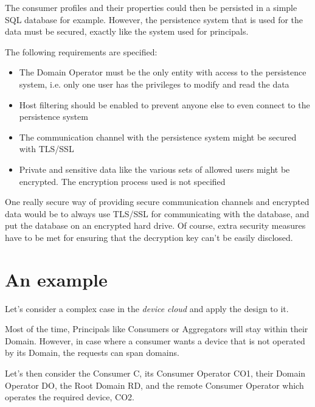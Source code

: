 The consumer profiles and their properties could then be persisted in a simple SQL database for example. However, the persistence system that is used for the data must be secured, exactly like the system used for principals.

The following requirements are specified:

\begin{itemize}
	\item The Domain Operator must be the only entity with access to the persistence system, i.e. only one user has the privileges to modify and read the data
	\item Host filtering should be enabled to prevent anyone else to even connect to the persistence system
	\item The communication channel with the persistence system might be secured with TLS/SSL
	\item Private and sensitive data like the various sets of allowed users might be encrypted. The encryption process used is not specified
\end{itemize}

One really secure way of providing secure communication channels and encrypted data would be to always use TLS/SSL for communicating with the database, and put the database on an encrypted hard drive. Of course, extra security measures have to be met for ensuring that the decryption key can't be easily disclosed.
	


\section{An example}
Let's consider a complex case in the \emph{device cloud} and apply the design to it.

Most of the time, Principals like Consumers or Aggregators will stay within their Domain. However, in case where a consumer wants a device that is not operated by its Domain, the requests can span domains.

Let's then consider the Consumer C, its Consumer Operator CO1, their Domain Operator DO, the Root Domain RD, and the remote Consumer Operator which operates the required device, CO2.

